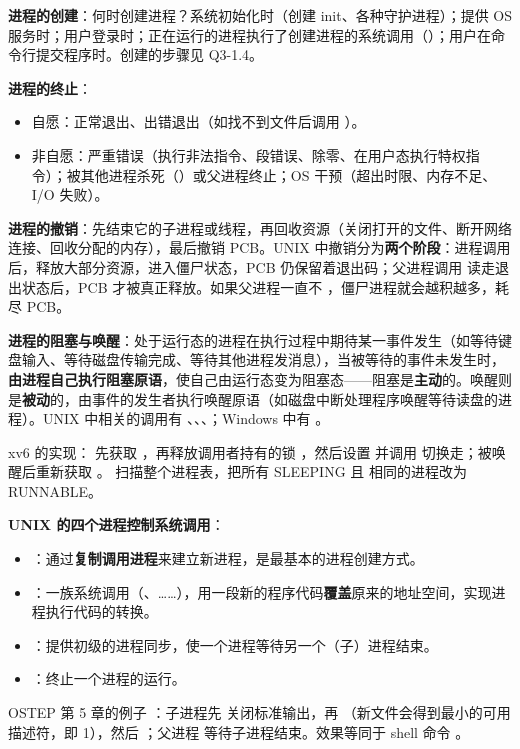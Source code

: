 \textbf{进程的创建}：何时创建进程？系统初始化时（创建 init、各种守护进程）；提供 OS 服务时；用户登录时；正在运行的进程执行了创建进程的系统调用（）；用户在命令行提交程序时。创建的步骤见 Q3-1.4。

\textbf{进程的终止}：
\begin{itemize}
    \item 自愿：正常退出、出错退出（如找不到文件后调用 ）。
    \item 非自愿：严重错误（执行非法指令、段错误、除零、在用户态执行特权指令）；被其他进程杀死（）或父进程终止；OS 干预（超出时限、内存不足、I/O 失败）。
\end{itemize}
\textbf{进程的撤销}：先结束它的子进程或线程，再回收资源（关闭打开的文件、断开网络连接、回收分配的内存），最后撤销 PCB。UNIX 中撤销分为\textbf{两个阶段}：进程调用  后，释放大部分资源，进入僵尸状态，PCB 仍保留着退出码；父进程调用  读走退出状态后，PCB 才被真正释放。如果父进程一直不 ，僵尸进程就会越积越多，耗尽 PCB。

\textbf{进程的阻塞与唤醒}：处于运行态的进程在执行过程中期待某一事件发生（如等待键盘输入、等待磁盘传输完成、等待其他进程发消息），当被等待的事件未发生时，\textbf{由进程自己执行阻塞原语}，使自己由运行态变为阻塞态——阻塞是\textbf{主动}的。唤醒则是\textbf{被动}的，由事件的发生者执行唤醒原语（如磁盘中断处理程序唤醒等待读盘的进程）。UNIX 中相关的调用有 、、、；Windows 中有 。

xv6 的实现： 先获取 ，再释放调用者持有的锁 ，然后设置  并调用  切换走；被唤醒后重新获取 。 扫描整个进程表，把所有 SLEEPING 且  相同的进程改为 RUNNABLE。

\textbf{UNIX 的四个进程控制系统调用}：
\begin{itemize}
    \item {}：通过\textbf{复制调用进程}来建立新进程，是最基本的进程创建方式。
    \item {}：一族系统调用（、……），用一段新的程序代码\textbf{覆盖}原来的地址空间，实现进程执行代码的转换。
    \item {}：提供初级的进程同步，使一个进程等待另一个（子）进程结束。
    \item {}：终止一个进程的运行。
\end{itemize}
OSTEP 第 5 章的例子 ：子进程先  关闭标准输出，再 （新文件会得到最小的可用描述符，即 1），然后 ；父进程  等待子进程结束。效果等同于 shell 命令 。

